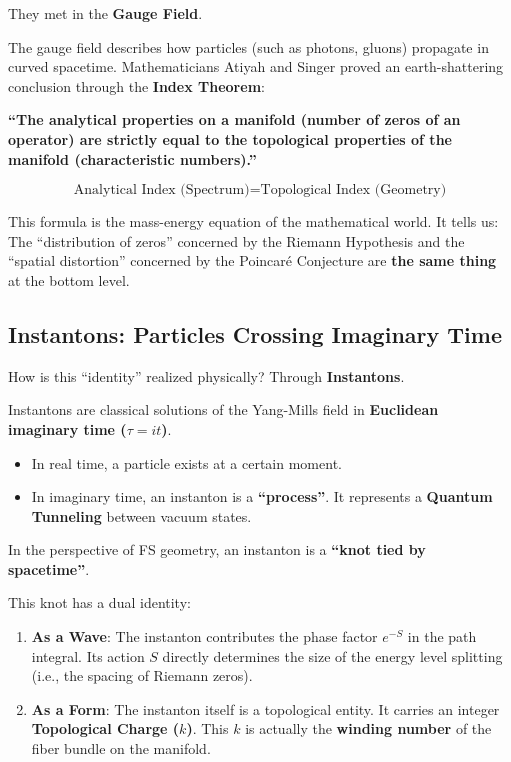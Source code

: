 \documentclass[11pt,a4paper,twoside]{book}
\begin{document}
They met in the \textbf{Gauge Field}.

The gauge field describes how particles (such as photons, gluons) propagate in curved spacetime. Mathematicians Atiyah and Singer proved an earth-shattering conclusion through the \textbf{Index Theorem}:

\textbf{``The analytical properties on a manifold (number of zeros of an operator) are strictly equal to the topological properties of the manifold (characteristic numbers).''}

$$\text{Analytical Index (Spectrum)} = \text{Topological Index (Geometry)}$$

This formula is the mass-energy equation of the mathematical world. It tells us: The ``distribution of zeros'' concerned by the Riemann Hypothesis and the ``spatial distortion'' concerned by the Poincaré Conjecture are \textbf{the same thing} at the bottom level.

\subsection{Instantons: Particles Crossing Imaginary Time}

How is this ``identity'' realized physically? Through \textbf{Instantons}.

Instantons are classical solutions of the Yang-Mills field in \textbf{Euclidean imaginary time ($\tau = it$)}.

\begin{itemize}
\item In real time, a particle exists at a certain moment.

\item In imaginary time, an instanton is a \textbf{``process''}. It represents a \textbf{Quantum Tunneling} between vacuum states.
\end{itemize}

In the perspective of FS geometry, an instanton is a \textbf{``knot tied by spacetime''}.

This knot has a dual identity:

\begin{enumerate}
\item \textbf{As a Wave}: The instanton contributes the phase factor $e^{-S}$ in the path integral. Its action $S$ directly determines the size of the energy level splitting (i.e., the spacing of Riemann zeros).

\item \textbf{As a Form}: The instanton itself is a topological entity. It carries an integer \textbf{Topological Charge ($k$)}. This $k$ is actually the \textbf{winding number} of the fiber bundle on the manifold.
\end{enumerate}
\end{document}

